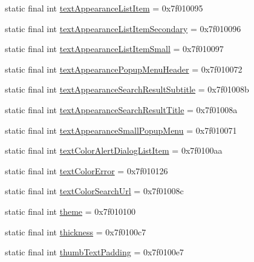\begin{CompactItemize}
\item 
static final int \hyperlink{classandroid_1_1support_1_1v7_1_1appcompat_1_1_r_1_1attr_3b634dfd7b2005f506845d90cfa5b224}{textAppearanceListItem} = 0x7f010095
\item 
static final int \hyperlink{classandroid_1_1support_1_1v7_1_1appcompat_1_1_r_1_1attr_d88f0b4a4a95bd2dea817fbce854658c}{textAppearanceListItemSecondary} = 0x7f010096
\item 
static final int \hyperlink{classandroid_1_1support_1_1v7_1_1appcompat_1_1_r_1_1attr_26430f8a45a873c796118da3077344b1}{textAppearanceListItemSmall} = 0x7f010097
\item 
static final int \hyperlink{classandroid_1_1support_1_1v7_1_1appcompat_1_1_r_1_1attr_50c70e906c25d53ad01817c28c8bd0fa}{textAppearancePopupMenuHeader} = 0x7f010072
\item 
static final int \hyperlink{classandroid_1_1support_1_1v7_1_1appcompat_1_1_r_1_1attr_786449180d399c63af8eb00c9872a48a}{textAppearanceSearchResultSubtitle} = 0x7f01008b
\item 
static final int \hyperlink{classandroid_1_1support_1_1v7_1_1appcompat_1_1_r_1_1attr_89c538c69f107212dd2d48c15c530b60}{textAppearanceSearchResultTitle} = 0x7f01008a
\item 
static final int \hyperlink{classandroid_1_1support_1_1v7_1_1appcompat_1_1_r_1_1attr_d52cdefc52c681af6805ceab9520ac2b}{textAppearanceSmallPopupMenu} = 0x7f010071
\item 
static final int \hyperlink{classandroid_1_1support_1_1v7_1_1appcompat_1_1_r_1_1attr_3442668007bdf19dd1361bdeb45df381}{textColorAlertDialogListItem} = 0x7f0100aa
\item 
static final int \hyperlink{classandroid_1_1support_1_1v7_1_1appcompat_1_1_r_1_1attr_f3ae62d791202b8899f4ae3dd1817342}{textColorError} = 0x7f010126
\item 
static final int \hyperlink{classandroid_1_1support_1_1v7_1_1appcompat_1_1_r_1_1attr_412c07b23d2c7d8d499663d944fe9d53}{textColorSearchUrl} = 0x7f01008c
\item 
static final int \hyperlink{classandroid_1_1support_1_1v7_1_1appcompat_1_1_r_1_1attr_3ed81f860c275251c36dedd4c949b1e8}{theme} = 0x7f010100
\item 
static final int \hyperlink{classandroid_1_1support_1_1v7_1_1appcompat_1_1_r_1_1attr_55545891441023a212e569343f4ff7a9}{thickness} = 0x7f0100c7
\item 
static final int \hyperlink{classandroid_1_1support_1_1v7_1_1appcompat_1_1_r_1_1attr_4a13e6b3e39cf30ae1328174f4962761}{thumbTextPadding} = 0x7f0100e7

\end{CompactItemize}
